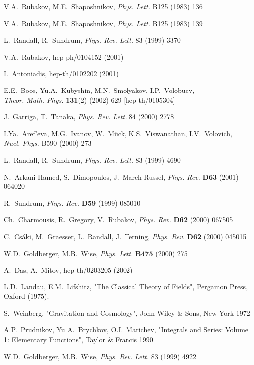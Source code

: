 \documentclass[a4paper,12pt]{article}
\begin{document}
\begin{thebibliography}{99}
V.A.~Rubakov, M.E.~Shaposhnikov, {\em Phys. Lett.} B125 (1983) 136

V.A.~Rubakov, M.E.~Shaposhnikov, {\em Phys. Lett.} B125 (1983) 139

L.~Randall, R.~Sundrum, {\em Phys. Rev. Lett.} 83 (1999) 3370

V.A.~Rubakov, hep-ph/0104152 (2001)

I.~Antoniadis, hep-th/0102202 (2001)

E.E.~Boos, Yu.A.~Kubyshin, M.N.~Smolyakov, I.P.~Volobuev,\\ {\em
Theor. Math. Phys.} {\bf 131}(2) (2002) 629 [hep-th/0105304]

J.~Garriga, T.~Tanaka, {\em Phys. Rev. Lett.} 84 (2000) 2778

 I.Ya.~Aref'eva, M.G.~Ivanov, W.~M\"uck,
K.S.~Viswanathan, I.V.~Volovich,\\ {\em Nucl. Phys.} B590 (2000)
273

L.~Randall, R.~Sundrum, {\em Phys. Rev. Lett.} 83 (1999) 4690

N.~Arkani-Hamed, S.~Dimopoulos, J.~March-Russel, {\em Phys. Rev.}
{\bf D63} (2001) 064020

R.~Sundrum, {\em Phys. Rev.} {\bf D59} (1999) 085010

Ch.~Charmousis, R.~Gregory, V.~Rubakov, {\em Phys. Rev.} {\bf D62}
(2000) 067505

C.~Cs\'aki, M.~Graesser, L.~Randall, J.~Terning, {\em Phys. Rev.}
{\bf D62} (2000) 045015

W.D.~Goldberger, M.B.~Wise, {\em Phys. Lett.} {\bf B475} (2000)
275

A.~Das, A.~Mitov, hep-th/0203205 (2002)

L.D.~Landau, E.M.~Lifshitz, "The Classical Theory of Fields",
Pergamon Press, Oxford (1975).

S.~Weinberg, "Gravitation and Cosmology", John Wiley \& Sons, New
York 1972

A.P.~Prudnikov, Yu A.~Brychkov, O.I.~Marichev, "Integrals and
Series: Volume 1: Elementary Functions", Taylor \& Francis 1990

W.D.~Goldberger, M.B.~Wise, {\em Phys. Rev. Lett.} 83 (1999) 4922


\end{thebibliography}
\end{document}

